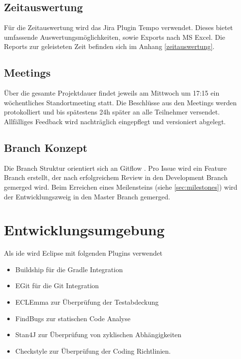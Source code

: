 \documentclass[11pt,a4paper,english,oneside]{book}
\numberwithin{equation}{chapter}
\begin{document}
	\subsection{Zeitauswertung}
	Für die Zeitauswertung wird das Jira Plugin Tempo \cite{jiratempo} verwendet. Dieses bietet umfassende Auswertungsmöglichkeiten, sowie Exports nach MS Excel. Die Reports zur geleisteten Zeit befinden sich im Anhang \ref{zeitauswertung}.
	
	\subsection{Meetings} \label{ssec:meeting}
	Über die gesamte Projektdauer findet jeweils am Mittwoch um 17:15 ein wöchentliches Standortmeeting statt. Die Beschlüsse aus den Meetings werden protokolliert und bis spätestens 24h später an alle Teilnehmer versendet. Allfälliges Feedback wird nachträglich eingepflegt und versioniert abgelegt.
	
	\subsection{Branch Konzept}
	Die Branch Struktur orientiert sich an Gitflow \cite{gitflow}. Pro Issue wird ein Feature Branch erstellt, der nach erfolgreichem Review in den Development Branch gemerged wird. Beim Erreichen eines Meilensteins (siehe \ref{sec:milestones}) wird der Entwicklungszweig in den Master Branch gemerged.
	
	
	
	\section{Entwicklungsumgebung}
	Als \gls{ide} wird Eclipse mit folgenden Plugins verwendet
	\begin{itemize}
		\item Buildship \cite{buildship} für die Gradle Integration
		\item EGit \cite{egit} für die Git Integration
		\item ECLEmma \cite{eclemma} zur Überprüfung der Testabdeckung
		\item FindBugs \cite{findbugs} zur statischen Code Analyse
		\item Stan4J \cite{stan4j} zur Überprüfung von zyklischen Abhängigkeiten
		\item Checkstyle \cite{checkstyle} zur Überprüfung der Coding Richtlinien.
	\end{itemize}
	
\end{document}
